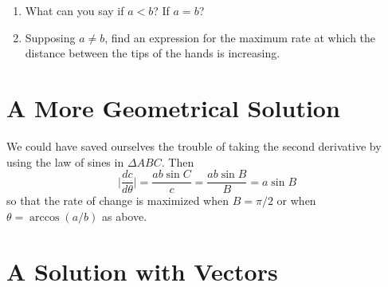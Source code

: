 \documentclass{ximera}
\begin{document}
\begin{question} \label{Qdgbhhtnnngnb}
\begin{enumerate}
\item What can you say if $a<b$? If $a=b$?

\item Supposing $a\neq b$, find an expression for the maximum rate at which the distance between the tips of the hands is increasing.
\end{enumerate}
\end{question}


\section*{A More Geometrical Solution}
We could have saved ourselves the trouble of taking the second derivative by using the law of sines in $\Delta ABC$. Then %
\[
    \Big| \frac{dc}{d\theta}  \Big| =   \frac{ab\sin C}{c}  = \frac{ab \sin B}{B} = a\sin B
\]
so that the rate of change is maximized when $B = \pi/2$ or when $\theta = \arccos(a/b)$ as above.



\section*{A Solution with Vectors}
\end{document}
